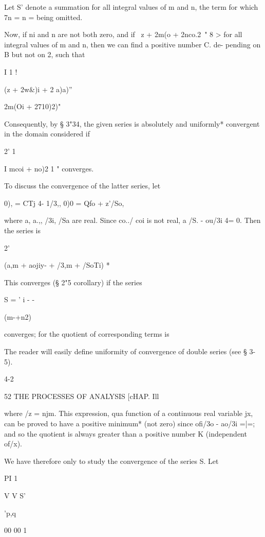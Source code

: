 Let S' denote a summation for all integral values of m and n, the term
for which 7n = n = being omitted.

Now, if ni and n are not both zero, and if \ z + 2m(o + 2nco.2\ " 8 >
for all integral values of m and n, then we can find a positive number
C. de- pending on B but not on 2, such that

I 1 !



(z + 2w\&)i + 2 a)a)''



 2m(Oi + 2710)2)"



Consequently, by § 3"34, the given series is absolutely and uniformly*
convergent in the domain considered if

2' 1

I mcoi + no)2 1 " converges.

To discuss the convergence of the latter series, let

0), = CTj 4- 1/3,, 0)0 = Qfo + z'/So,

where a, a.,, /3i, /Sa are real. Since co../ coi is not real, a /S. -
ou/3i 4= 0. Then the series is

2'

 (a,m + aojiy- + /3,m + /SoTi) *

This converges (§ 2"5 corollary) if the series

S = ' i - -

(m-+n2)

converges; for the quotient of corresponding terms is

The reader will easily define uniformity of convergence of double
series (see § 3-5).

4-2



52 THE PROCESSES OF ANALYSIS [cHAP. Ill

where /z = njm. This expression, qua function of a continuous real
variable jx, can be proved to have a positive minimum* (not zero)
since ofi/3o - ao/3i =|=; and so the quotient is always greater than
a positive number K (independent of/x).

We have therefore only to study the convergence of the series S. Let

PI 1

V V S'



 'p,q



00 00 1

